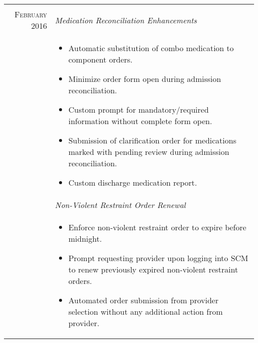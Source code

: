 \documentclass[letter,11pt,DIV=20]{scrartcl}
\begin{document}
\begin{tabu}{r|X}
   \\
  
  \textsc{February 2016} & \emph{Medication Reconciliation Enhancements}
 \\ &{\small\vspace{-0.5em} 
\begin{itemize}[topsep=0pt,nosep,noitemsep,leftmargin=1em]
     \item Automatic substitution of combo medication to component orders.
     \item Minimize order form open during admission reconciliation.
     \item Custom prompt for mandatory/required information without complete form open.
     \item Submission of clarification order for medications marked with pending review during admission reconciliation.
     \item Custom discharge medication report.
\end{itemize}} \\ 
& \emph{Non-Violent Restraint Order Renewal} 
\\ &{\small\vspace{-0.5em} 
\begin{itemize}[topsep=0pt,nosep,noitemsep,leftmargin=1em]
     \item Enforce non-violent restraint order to expire before midnight.
     \item Prompt requesting provider upon logging into SCM to renew previously expired non-violent restraint orders.
     \item Automated order submission from provider selection without any additional action from provider.
\end{itemize}} \\ 


\end{tabu}
\end{document}
